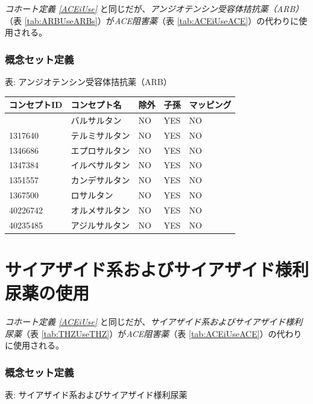 \documentclass[
  11pt]{book}
\theoremstyle{definition}
\theoremstyle{definition}
\theoremstyle{definition}
\theoremstyle{definition}
\theoremstyle{remark}
\begin{document}
\emph{コホート定義 \ref{ACEiUse}} と同じだが、\emph{アンジオテンシン受容体拮抗薬（ARB）}（表 \ref{tab:ARBUseARBs}）が\emph{ACE阻害薬}（表 \ref{tab:ACEiUseACE}）の代わりに使用される。

\subsubsection*{概念セット定義}\label{ux6982ux5ff5ux30bbux30c3ux30c8ux5b9aux7fa9-2}

表: \label{tab:ARBUseARBs} アンジオテンシン受容体拮抗薬（ARB）

\begin{longtable}[]{@{}lllll@{}}
\toprule\noalign{}
コンセプトID & コンセプト名 & 除外 & 子孫 & マッピング \\
\midrule\noalign{}
\endhead
\bottomrule\noalign{}
\endlastfoot
1308842 & バルサルタン & NO & YES & NO \\
1317640 & テルミサルタン & NO & YES & NO \\
1346686 & エプロサルタン & NO & YES & NO \\
1347384 & イルベサルタン & NO & YES & NO \\
1351557 & カンデサルタン & NO & YES & NO \\
1367500 & ロサルタン & NO & YES & NO \\
40226742 & オルメサルタン & NO & YES & NO \\
40235485 & アジルサルタン & NO & YES & NO \\
\end{longtable}

\section{サイアザイド系およびサイアザイド様利尿薬の使用}\label{THZUse}

\emph{コホート定義 \ref{ACEiUse}} と同じだが、\emph{サイアザイド系およびサイアザイド様利尿薬}（表 \ref{tab:THZUseTHZ}）が\emph{ACE阻害薬}（表 \ref{tab:ACEiUseACE}）の代わりに使用される。

\subsubsection*{概念セット定義}\label{ux6982ux5ff5ux30bbux30c3ux30c8ux5b9aux7fa9-3}

表: \label{tab:THZUseTHZ} サイアザイド系およびサイアザイド様利尿薬
\end{document}
